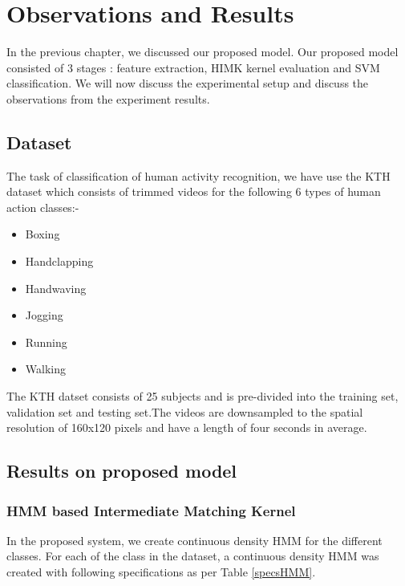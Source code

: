 \chapter{Observations and Results}\label{Observations}
\thispagestyle{empty}
\setlength{\parskip}{10pt plus 5pt minus 3pt}
\setlength{\parindent}{20pt}%

%
In the previous chapter, we discussed our proposed model. Our proposed model consisted of 3 stages : feature extraction, HIMK kernel evaluation and SVM classification. We will now discuss the experimental setup and discuss the observations from the experiment results.

\section{Dataset}
The task of classification of human activity recognition, we have use the KTH dataset which consists of trimmed videos for the following 6 types of human action classes:-
\begin{itemize}
\item Boxing
\item Handclapping
\item Handwaving
\item Jogging
\item Running
\item Walking
\end{itemize}
The KTH datset consists of 25 subjects and is pre-divided into the training set, validation set and testing set.The videos are downsampled to the spatial resolution of 160x120 pixels and have a length of four seconds in average.

\section{Results on proposed model}
\subsection{HMM based Intermediate Matching Kernel}
In the proposed system, we create continuous density HMM for the different classes. For each of the class in the dataset,  a continuous density HMM was created with following specifications as per Table \ref{specsHMM}. \\

